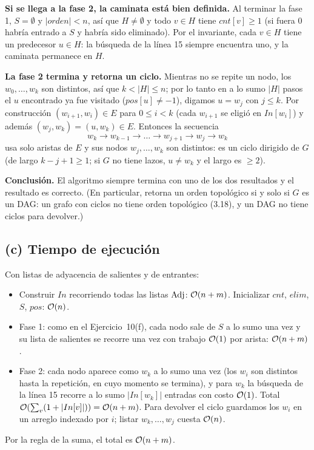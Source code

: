 \textbf{Si se llega a la fase 2, la caminata está bien definida.} Al terminar la fase 1, $S=\emptyset$
y $|orden|<n$, así que $H\ne\emptyset$ y todo $v\in H$ tiene $cnt[v]\ge1$ (si fuera 0 habría entrado a
$S$ y habría sido eliminado). Por el invariante, cada $v\in H$ tiene un predecesor $u\in H$: la búsqueda
de la línea 15 siempre encuentra uno, y la caminata permanece en $H$.

\textbf{La fase 2 termina y retorna un ciclo.} Mientras no se repite un nodo, los $w_0,\dots,w_k$ son
distintos, así que $k<|H|\le n$; por lo tanto en a lo sumo $|H|$ pasos el $u$ encontrado ya fue visitado
($pos[u]\neq-1$), digamos $u=w_j$ con $j\le k$. Por construcción $(w_{i+1},w_i)\in E$ para $0\le i<k$
(cada $w_{i+1}$ se eligió en $In[w_i]$) y además $(w_j,w_k)=(u,w_k)\in E$. Entonces la secuencia
\[ w_k\to w_{k-1}\to\dots\to w_{j+1}\to w_j\to w_k \]
usa solo aristas de $E$ y sus nodos $w_j,\dots,w_k$ son distintos: es un ciclo dirigido de $G$ (de
largo $k-j+1\ge1$; si $G$ no tiene lazos, $u\ne w_k$ y el largo es $\ge2$).

\textbf{Conclusión.} El algoritmo siempre termina con uno de los dos resultados y el resultado es
correcto. (En particular, retorna un orden topológico si y solo si $G$ es un DAG: un grafo con ciclos no
tiene orden topológico (3.18), y un DAG no tiene ciclos para devolver.)

\subsection*{(c) Tiempo de ejecución}
Con listas de adyacencia de salientes y de entrantes:
\begin{itemize}[nosep]
\item Construir $In$ recorriendo todas las listas $\mathrm{Adj}$: $\mathcal{O}(n+m)$. Inicializar $cnt$, $elim$, $S$, $pos$: $\mathcal{O}(n)$.
\item Fase 1: como en el Ejercicio~10(f), cada nodo sale de $S$ a lo sumo una vez y su lista de salientes
se recorre una vez con trabajo $\mathcal{O}(1)$ por arista: $\mathcal{O}(n+m)$.
\item Fase 2: cada nodo aparece como $w_k$ a lo sumo una vez (los $w_i$ son distintos hasta la
repetición, en cuyo momento se termina), y para $w_k$ la búsqueda de la línea 15 recorre a lo sumo
$|In[w_k]|$ entradas con costo $\mathcal{O}(1)$. Total $\mathcal{O}(\sum_v(1+|In[v]|))=\mathcal{O}(n+m)$. Para devolver el
ciclo guardamos los $w_i$ en un arreglo indexado por $i$; listar $w_k,\dots,w_j$ cuesta $\mathcal{O}(n)$.
\end{itemize}
Por la regla de la suma, el total es $\mathcal{O}(n+m)$.

